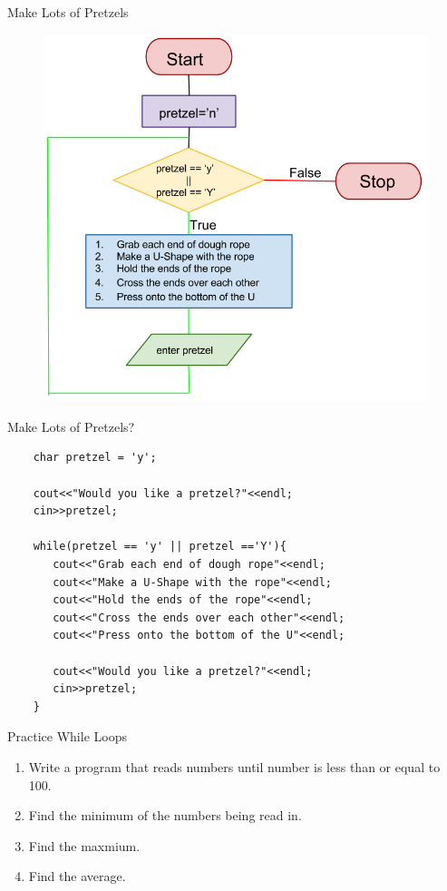 \documentclass[xcolor={dvipsnames}]{beamer}
\begin{document}
\begin{frame}{Make Lots of Pretzels}
	\begin{figure}
		\includegraphics[width=.75\textwidth]{while_pretzels}
	\end{figure}
\end{frame}

%
\begin{frame}[fragile]{Make Lots of  Pretzels?}
\begin{verbatim}
    char pretzel = 'y';

    cout<<"Would you like a pretzel?"<<endl;
    cin>>pretzel;

    while(pretzel == 'y' || pretzel =='Y'){
       cout<<"Grab each end of dough rope"<<endl;
       cout<<"Make a U-Shape with the rope"<<endl;
       cout<<"Hold the ends of the rope"<<endl;
       cout<<"Cross the ends over each other"<<endl;
       cout<<"Press onto the bottom of the U"<<endl;       

       cout<<"Would you like a pretzel?"<<endl;
       cin>>pretzel;
    }
\end{verbatim}
\end{frame}

\begin{frame}{Practice While Loops}
\begin{enumerate}
	\item Write a program that reads numbers until number is less than or equal to 100.
	\item Find the minimum of the numbers being read in. 
	\item Find the maxmium.
	\item Find the average.
\end{enumerate}
\end{frame}
\end{document}
